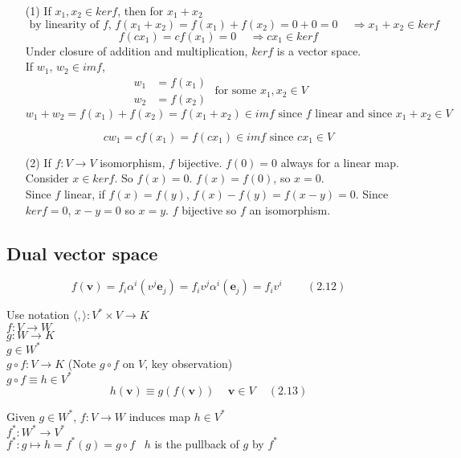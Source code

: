 \documentclass{book}
\newcommand{\exercisehead}[1]
  {\smallskip
   \noindent{\large\bf Exercise #1.}
   }
\begin{document}
\exercisehead{2.8}

\begin{enumerate}
 \item[(1)] If $x_1, x_2 \in ker{f}$, then for $x_1 + x_2$
\[
\text{ by linearity of $f$, } f(x_1 + x_2) = f(x_1) + f(x_2) = 0 + 0 = 0 \quad \, \Longrightarrow x_1 + x_2 \in ker{f}
\]
\[
f(cx_1) = cf(x_1) = 0 \quad \, \Longrightarrow cx_1 \in ker{f}
\]
Under closure of addition and multiplication, $ker{f}$ is a vector space.   \\

If $w_1, \, w_2 \in im{f}$, 
\[
\begin{aligned} w_1 & = f(x_1) \\ w_2 & = f(x_2) \end{aligned} \text{ for some } x_1, x_2 \in V
\]
\[
w_1 + w_2 = f(x_1) + f(x_2) = f(x_1 + x_2) \in im{f} \text{ since $f$ linear and since } x_1 + x_2 \in V
\]

\[
cw_1 = cf(x_1) = f(cx_1) \in im{f} \text{ since } cx_1 \in V
\]
\item[(2)] If $f:V \to V$ isomorphism, $f$ bijective. $f(0)=0$ always for a linear map. Consider $x \in ker{f}$. So $f(x) =0$.  $f(x) = f(0)$, so $x=0$.  \\
Since $f$ linear, if $f(x) = f(y)$, $f(x) - f(y) = f(x-y) =0$.  Since $ker{f} =0$, $x-y =0$ so $x=y$.  $f$ bijective so $f$ an isomorphism.  
\end{enumerate}

\subsection{Dual vector space}

\[
f(\mathbf{v}) = f_i \alpha^i(v^j \mathbf{e}_j ) = f_i v^j \alpha^i(\mathbf{e}_j) = f_i v^i \quad \quad \, (2.12)
\]

Use notation $\langle, \rangle : V^* \times V \to K$ \\

$f: V \to W$ \\
$g: W \to K$ \\
$g\in W^*$ \\
$g\circ f : V \to K$ (Note $g\circ f$ on $V$, key observation) \\
$g\circ f \equiv h \in V^*$ 
\[
h(\mathbf{v}) \equiv g(f(\mathbf{v})) \quad \, \mathbf{v} \in V \quad \, (2.13)
\]

Given $g \in W^*$, $f:V \to W$ induces map $h\in V^*$ \\
$f^*: W^* \to V^*$ \\
$f^*:g \mapsto h = f^*(g) = g\circ f$ \quad \, $h$ is the pullback of $g$ by $f^*$
\end{document}
